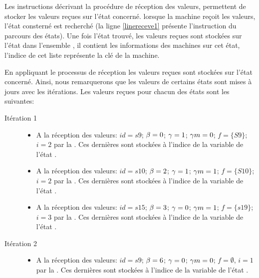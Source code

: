 Les instructions décrivant la procédure de réception des valeurs, permettent de stocker les valeurs reçues sur l'état concerné. lorsque la machine reçoit les valeurs, l'état consterné est recherché (la ligne \ref{linereceve1} présente l'instruction du parcours des états). Une fois l'état trouvé, les valeurs reçues sont stockées sur l'état dans l'ensemble , il contient les informations des machines sur cet état, l'indice de cet liste représente la clé de la machine. 

\begin{Exemple}\label{ea4}
	En appliquant le processus de réception les valeurs reçues sont stockées sur l'état concerné. Ainsi, nous remarquerons que les valeurs de certains états sont mises à jours avec les itérations.  Les valeurs reçues pour chacun des états sont les suivantes:
	
	\begin{description}
	\item[Itération 1]
		\begin{itemize}
		\item A la réception des valeurs: $id =s9$; $\beta{}=0$; $\gamma{}=1$; $\gamma m{}=0$; $f =\{S9\}$; $i=2$ par la \mone{}. Ces dernières sont stockées à l'indice  de la variable   de l'état .
		
		\item A la réception des valeurs: $id =s10$; $\beta{}=2$; $\gamma{}=1$; $\gamma m{}=1$; $f =\{S10\}$; $i=2$ par la \mone{}. Ces dernières sont stockées à l'indice  de la variable   de l'état .
		
		\item A la réception des valeurs: $id =s15$; $\beta{}=3$; $\gamma{}=0$; $\gamma m{}=1$; $f =\{s19\}$; $i=3$ par la \mtwo{}. Ces dernières sont stockées à l'indice  de la variable   de l'état .
		\end{itemize}
	\item[Itération 2]
		\begin{itemize}
			\item A la réception des valeurs: $id =s9$; $\beta{} =6$; $\gamma{} =0$; $\gamma m{}=0$; $f =\emptyset$, $i=1$ par la \mtwo{}. Ces dernières sont stockées à l'indice  de la variable   de l'état .
			

\end{itemize}
\end{description}
\end{Exemple}
